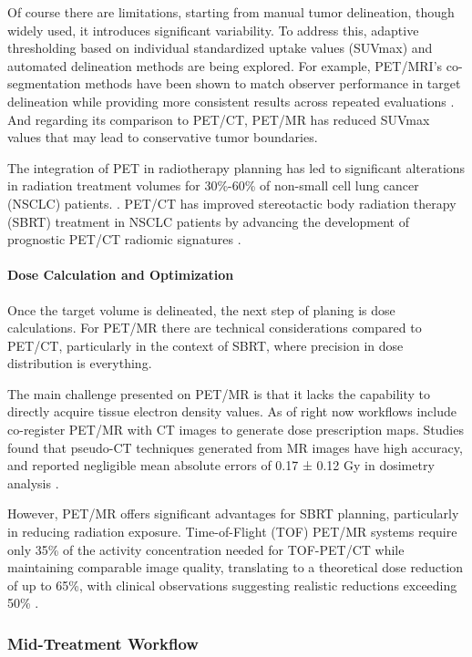 \begin{multicols}{2}
Of course there are limitations, starting from manual tumor delineation, though widely used, it introduces significant variability. To address this, adaptive thresholding based on individual standardized uptake values (SUVmax) and automated delineation methods are being explored. For example, PET/MRI’s co-segmentation methods have been shown to match observer performance in target delineation while providing more consistent results across repeated evaluations \cite{yan2024}. And regarding its comparison to PET/CT, PET/MR has reduced SUVmax values that may lead to conservative tumor boundaries.

The integration of PET in radiotherapy planning has led to significant alterations in radiation treatment volumes for 30\%-60\% of non-small cell lung cancer (NSCLC) patients. \cite{Bradley2004}. PET/CT has improved stereotactic body radiation therapy (SBRT) treatment in NSCLC patients by advancing the development of prognostic PET/CT radiomic signatures \cite{Vijayakumar2022}.

\paragraph{Dose Calculation and Optimization}

Once the target volume is delineated, the next step of planing is dose calculations. For PET/MR there are technical considerations compared to PET/CT, particularly in the context of SBRT, where precision in dose distribution is everything.

The main challenge presented on PET/MR is that it lacks the capability to directly acquire tissue electron density values. As of right now workflows include co-register PET/MR with CT images to generate dose prescription maps. Studies found that pseudo-CT techniques generated from MR images have high accuracy, and reported negligible mean absolute errors of 0.17 ± 0.12 Gy in dosimetry analysis \cite{yan2024}.

However, PET/MR offers significant advantages for SBRT planning, particularly in reducing radiation exposure. Time-of-Flight (TOF) PET/MR systems require only 35\% of the activity concentration needed for TOF-PET/CT while maintaining comparable image quality, translating to a theoretical dose reduction of up to 65\%, with clinical observations suggesting realistic reductions exceeding 50\% \cite{Queiroz2015,Polan2023}. 

\subsubsection{Mid-Treatment Workflow}


\end{multicols}
